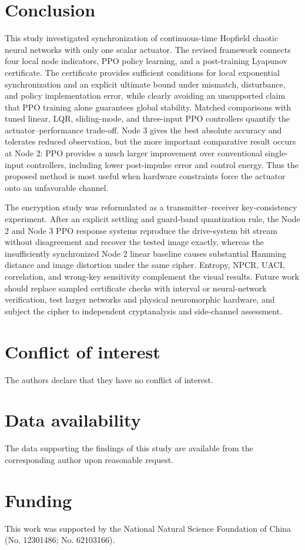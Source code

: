 \documentclass[10pt,twocolumn]{article}
\newcommand{\rev}[1]{{\color{revisionblue}#1}}
\theoremstyle{definition}
\begin{document}
\section{Conclusion}
\label{sec:conclusion}

\rev{This study investigated synchronization of continuous-time Hopfield chaotic neural networks with only one scalar actuator. The revised framework connects four local node indicators, PPO policy learning, and a post-training Lyapunov certificate. The certificate provides sufficient conditions for local exponential synchronization and an explicit ultimate bound under mismatch, disturbance, and policy implementation error, while clearly avoiding an unsupported claim that PPO training alone guarantees global stability. Matched comparisons with tuned linear, LQR, sliding-mode, and three-input PPO controllers quantify the actuator--performance trade-off. Node 3 gives the best absolute accuracy and tolerates reduced observation, but the more important comparative result occurs at Node 2: PPO provides a much larger improvement over conventional single-input controllers, including lower post-impulse error and control energy. Thus the proposed method is most useful when hardware constraints force the actuator onto an unfavorable channel.}

\rev{The encryption study was reformulated as a transmitter--receiver key-consistency experiment. After an explicit settling and guard-band quantization rule, the Node 2 and Node 3 PPO response systems reproduce the drive-system bit stream without disagreement and recover the tested image exactly, whereas the insufficiently synchronized Node 2 linear baseline causes substantial Hamming distance and image distortion under the same cipher. Entropy, NPCR, UACI, correlation, and wrong-key sensitivity complement the visual results. Future work should replace sampled certificate checks with interval or neural-network verification, test larger networks and physical neuromorphic hardware, and subject the cipher to independent cryptanalysis and side-channel assessment.}




\section*{Conflict of interest}
The authors declare that they have no conflict of interest.

\section*{Data availability}
The data supporting the findings of this study are available from the corresponding author upon reasonable request.

\section*{Funding}
This work was supported by the National Natural Science Foundation of China (No. 12301486; No. 62103166).

\balance



\end{document}
